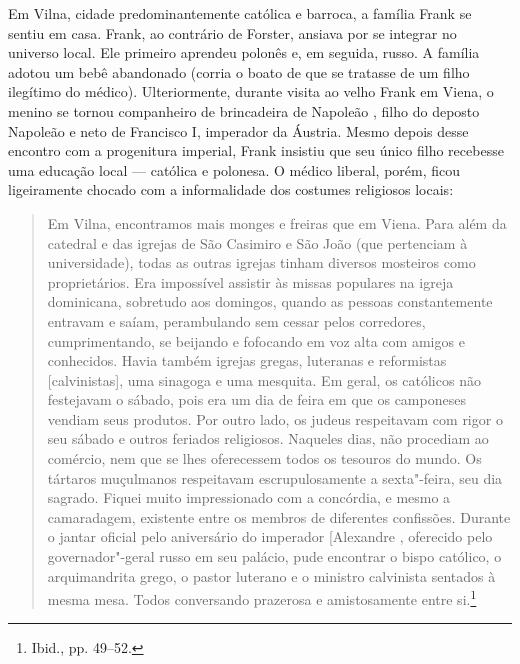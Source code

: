 Em Vilna, cidade predominantemente católica e barroca, a família Frank
se sentiu em casa. Frank, ao contrário de Forster, ansiava por se
integrar no universo local. Ele primeiro aprendeu polonês e, em seguida,
russo. A família adotou um bebê abandonado (corria o boato de que se
tratasse de um filho ilegítimo do médico). Ulteriormente, durante visita
ao velho Frank em Viena, o menino se tornou companheiro de brincadeira
de Napoleão , filho do deposto Napoleão e neto de Francisco I,
imperador da Áustria. Mesmo depois desse encontro com a progenitura
imperial, Frank insistiu que seu único filho recebesse uma educação
local --- católica e polonesa. O médico liberal, porém, ficou ligeiramente
chocado com a informalidade dos costumes religiosos locais:

\begin{quote}
Em Vilna, encontramos mais monges e freiras que em Viena. Para além da
catedral e das igrejas de São Casimiro e São João (que pertenciam à
universidade), todas as outras igrejas tinham diversos mosteiros como
proprietários. Era impossível assistir às missas populares na igreja
dominicana, sobretudo aos domingos, quando as pessoas constantemente
entravam e saíam, perambulando sem cessar pelos corredores,
cumprimentando, se beijando e fofocando em voz alta com amigos e
conhecidos. Havia também igrejas gregas, luteranas e reformistas
{[}calvinistas{]}, uma sinagoga e uma mesquita. Em geral, os católicos
não festejavam o sábado, pois era um dia de feira em que os camponeses
vendiam seus produtos. Por outro lado, os judeus respeitavam com rigor o
seu sábado e outros feriados religiosos. Naqueles dias, não procediam ao
comércio, nem que se lhes oferecessem todos os tesouros do mundo. Os
tártaros muçulmanos respeitavam escrupulosamente a sexta"-feira, seu dia
sagrado. Fiquei muito impressionado com a concórdia, e mesmo a
camaradagem, existente entre os membros de diferentes confissões.
Durante o jantar oficial pelo aniversário do imperador {[}Alexandre
\versal{i}{]}, oferecido pelo governador"-geral russo em seu palácio, pude
encontrar o bispo católico, o arquimandrita grego, o pastor luterano e o
ministro calvinista sentados à mesma mesa. Todos conversando prazerosa e
amistosamente entre si.\footnote{Ibid., pp. 49--52.}
\end{quote}

